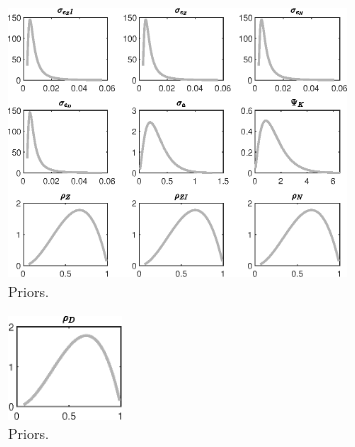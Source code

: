  
\begin{figure}[H]
\centering
\includegraphics[width=0.80\textwidth]{BRS_extended_fd/graphs/BRS_extended_fd_Priors1}
\caption{Priors.}\label{Fig:Priors:1}
\end{figure}
\begin{figure}[H]
\centering
\includegraphics[width=0.27\textwidth]{BRS_extended_fd/graphs/BRS_extended_fd_Priors2}
\caption{Priors.}\label{Fig:Priors:2}
\end{figure}
 
